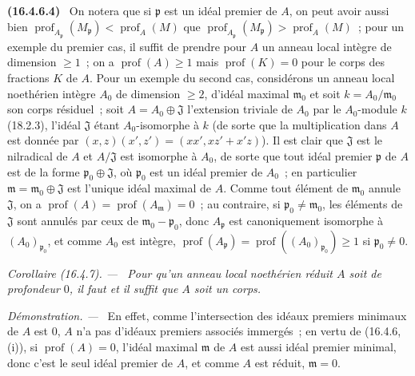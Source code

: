 \documentclass[10pt,oneside]{book}
\makeatletter
\newcommand{\setmanualcurrentlabel}[1]{\def\@currentlabel{#1}}
\newcommand{\oldpage}[2][]{%
  \setcounter{footnote}{0}%
  \marginpar{\scriptsize\textbf{#1}~|~#2}\ignorespaces}
\newenvironment{env}[1][]{\setmanualcurrentlabel{#1}\par\medskip\noindent\textbf{(#1)}\ }{\par}
\newenvironment{corollary}[1][]{%
  \setmanualcurrentlabel{#1}\par\medskip\noindent\itshape Corollaire (#1). ---\ }{\par}
\newenvironment{proof}{%
  \par\medskip\noindent\textit{Démonstration. ---\ }}{\par}
\makeatother
\begin{document}
\begin{env}[16.4.6.4]
\label{0.16.4.6.4-fr}
On notera que si $\mathfrak{p}$ est un idéal premier de $A$, on peut avoir
aussi bien
$\operatorname{prof}_{A_{\mathfrak{p}}}(M_{\mathfrak{p}})
<\operatorname{prof}_A(M)$ que
$\operatorname{prof}_{A_{\mathfrak{p}}}(M_{\mathfrak{p}})
>\operatorname{prof}_A(M)$~; pour un exemple du premier cas,
\oldpage[0\textsubscript{IV-1}]{35}
il suffit de prendre pour $A$ un anneau local intègre de dimension $\geq1$~; on a
$\operatorname{prof}(A)\geq1$ mais $\operatorname{prof}(K)=0$ pour le corps
des fractions $K$ de $A$. Pour un exemple du second cas, considérons un
anneau local noethérien intègre $A_0$ de dimension $\geq2$, d'idéal maximal
$\mathfrak{m}_0$ et soit $k=A_0/\mathfrak{m}_0$ son corps résiduel~; soit
$A=A_0\oplus\mathfrak{J}$ l'extension triviale de $A_0$ par le $A_0$-module
$k$ (18.2.3), l'idéal $\mathfrak{J}$ étant $A_0$-isomorphe à $k$ (de sorte
que la multiplication dans $A$ est donnée par
$(x,z)(x',z')=(xx',xz'+x'z)$). Il est clair que $\mathfrak{J}$ est le
nilradical de $A$ et $A/\mathfrak{J}$ est isomorphe à $A_0$, de sorte que
tout idéal premier $\mathfrak{p}$ de $A$ est de la forme
$\mathfrak{p}_0\oplus\mathfrak{J}$, où $\mathfrak{p}_0$ est un idéal premier
de $A_0$~; en particulier $\mathfrak{m}=\mathfrak{m}_0\oplus\mathfrak{J}$
est l'unique idéal maximal de $A$. Comme tout élément de $\mathfrak{m}_0$
annule $\mathfrak{J}$, on a
$\operatorname{prof}(A)=\operatorname{prof}(A_{\mathfrak{m}})=0$~; au
contraire, si $\mathfrak{p}_0\neq\mathfrak{m}_0$, les éléments de
$\mathfrak{J}$ sont annulés par ceux de
$\mathfrak{m}_0-\mathfrak{p}_0$, donc $A_{\mathfrak{p}}$ est canoniquement
isomorphe à $(A_0)_{\mathfrak{p}_0}$, et comme $A_0$ est intègre,
$\operatorname{prof}(A_{\mathfrak{p}})
=\operatorname{prof}((A_0)_{\mathfrak{p}_0})\geq1$ si
$\mathfrak{p}_0\neq0$.
\end{env}

\begin{corollary}[16.4.7]
\label{0.16.4.7-fr}
Pour qu'un anneau local noethérien réduit $A$ soit de profondeur $0$, il faut
et il suffit que $A$ soit un corps.
\end{corollary}

\begin{proof}
En effet, comme l'intersection des idéaux premiers minimaux de $A$ est $0$,
$A$ n'a pas d'idéaux premiers associés immergés~; en vertu de (16.4.6, (i)),
si $\operatorname{prof}(A)=0$, l'idéal maximal $\mathfrak{m}$ de $A$ est
aussi idéal premier minimal, donc c'est le seul idéal premier de $A$, et
comme $A$ est réduit, $\mathfrak{m}=0$.
\end{proof}
\end{document}
